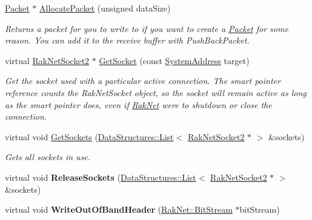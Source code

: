 \begin{DoxyCompactItemize}
\item 
\hyperlink{struct_rak_net_1_1_packet}{Packet} $\ast$ \hyperlink{class_rak_net_1_1_rak_peer_a5be8b42a06fdd32f29f032ba5fc5e7b0}{Allocate\-Packet} (unsigned data\-Size)
\begin{DoxyCompactList}\small\item\em Returns a packet for you to write to if you want to create a \hyperlink{struct_rak_net_1_1_packet}{Packet} for some reason. You can add it to the receive buffer with Push\-Back\-Packet. \end{DoxyCompactList}\item 
virtual \hyperlink{class_rak_net_1_1_rak_net_socket2}{Rak\-Net\-Socket2} $\ast$ \hyperlink{class_rak_net_1_1_rak_peer_ab69ef5d63339d36dc99b905586a23151}{Get\-Socket} (const \hyperlink{struct_rak_net_1_1_system_address}{System\-Address} target)
\begin{DoxyCompactList}\small\item\em Get the socket used with a particular active connection. The smart pointer reference counts the Rak\-Net\-Socket object, so the socket will remain active as long as the smart pointer does, even if \hyperlink{namespace_rak_net}{Rak\-Net} were to shutdown or close the connection. \end{DoxyCompactList}\item 
virtual void \hyperlink{class_rak_net_1_1_rak_peer_a35c353846b88cb39d4c8d12ba4f5ca42}{Get\-Sockets} (\hyperlink{class_data_structures_1_1_list}{Data\-Structures\-::\-List}$<$ \hyperlink{class_rak_net_1_1_rak_net_socket2}{Rak\-Net\-Socket2} $\ast$ $>$ \&sockets)
\begin{DoxyCompactList}\small\item\em Gets all sockets in use. \end{DoxyCompactList}\item 
\hypertarget{class_rak_net_1_1_rak_peer_a10dcb3bdc7da7df13f18d7b00572ddb5}{virtual void {\bfseries Release\-Sockets} (\hyperlink{class_data_structures_1_1_list}{Data\-Structures\-::\-List}$<$ \hyperlink{class_rak_net_1_1_rak_net_socket2}{Rak\-Net\-Socket2} $\ast$ $>$ \&sockets)}\label{class_rak_net_1_1_rak_peer_a10dcb3bdc7da7df13f18d7b00572ddb5}

\item 
\hypertarget{class_rak_net_1_1_rak_peer_a990ba7664ecd900df4e772222725bf41}{virtual void {\bfseries Write\-Out\-Of\-Band\-Header} (\hyperlink{class_rak_net_1_1_bit_stream}{Rak\-Net\-::\-Bit\-Stream} $\ast$bit\-Stream)}\label{class_rak_net_1_1_rak_peer_a990ba7664ecd900df4e772222725bf41}


\end{DoxyCompactItemize}
